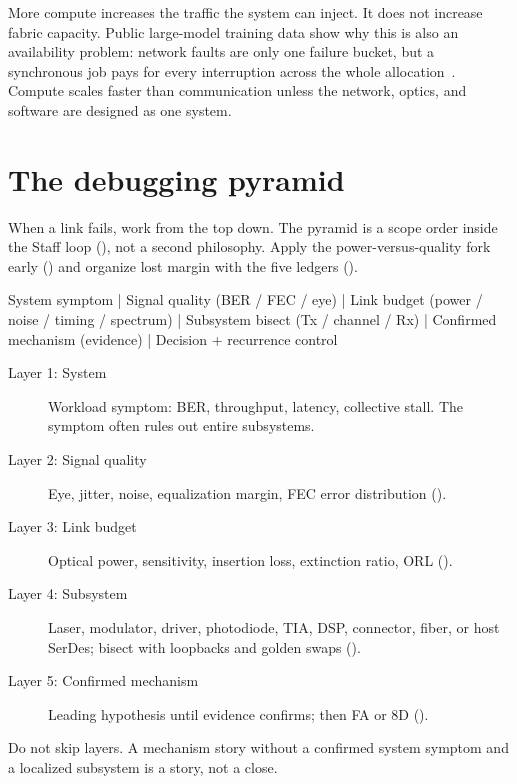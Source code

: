 More compute increases the traffic the system can inject. It does not increase
fabric capacity. Public large-model training data show why this is also an
availability problem: network faults are only one failure bucket, but a
synchronous job pays for every interruption across the whole
allocation~\cite{metallama3}. Compute scales faster than communication unless
the network, optics, and software are designed as one system.

\section{The debugging pyramid}
\label{sec:debug-pyramid}

When a link fails, work from the top down. The pyramid is a scope order inside
the Staff loop (), not a second philosophy.
Apply the power-versus-quality fork early
() and organize lost margin with the
five ledgers ().

\begin{dectree}
System symptom
  |
Signal quality (BER / FEC / eye)
  |
Link budget (power / noise / timing / spectrum)
  |
Subsystem bisect (Tx / channel / Rx)
  |
Confirmed mechanism (evidence)
  |
Decision + recurrence control
\end{dectree}

\begin{description}
\item[Layer 1: System] Workload symptom: BER, throughput, latency, collective
      stall. The symptom often rules out entire subsystems.
\item[Layer 2: Signal quality] Eye, jitter, noise, equalization margin, FEC
      error distribution ().
\item[Layer 3: Link budget] Optical power, sensitivity, insertion loss,
      extinction ratio, ORL ().
\item[Layer 4: Subsystem] Laser, modulator, driver, photodiode, TIA, DSP,
      connector, fiber, or host SerDes; bisect with loopbacks and golden swaps
      ().
\item[Layer 5: Confirmed mechanism] Leading hypothesis until evidence confirms;
      then FA or 8D ().
\end{description}

Do not skip layers. A mechanism story without a confirmed system symptom and a
localized subsystem is a story, not a close.

